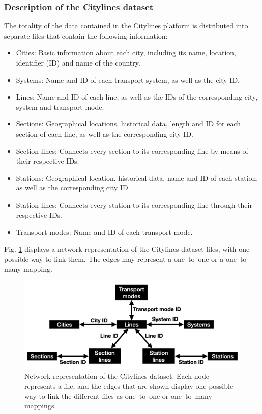 \subsubsection*{Description of the Citylines dataset}
The totality of the data contained in the Citylines platform is distributed into separate files that contain the following information:
\begin{itemize}
	\item Cities: Basic information about each city, including its name, location, identifier (ID) and name of the country.
	\item Systems: Name and ID of each transport system, as well as the city ID.
	\item Lines: Name and ID of each line, as well as the IDs of the corresponding city, system and transport mode.
	\item Sections: Geographical locations, historical data, length and ID for each section of each line, as well as the corresponding city ID.
	\item Section lines: Connects every section to its corresponding line by means of their respective IDs.
	\item Stations: Geographical location, historical data, name and ID of each station, as well as the corresponding city ID.
	\item Station lines: Connects every station to its corresponding line through their respective IDs.
	\item Transport modes: Name and ID of each transport mode.
\end{itemize}

Fig. \ref{fig:SM_cityline_dataset} displays a network representation of the Citylines dataset files, with one possible way to link them. The edges may represent a one--to--one or a one--to--many mapping.


\begin{figure}[!h]
	\begin{center}
	\includegraphics[scale=0.4]{./images/task_41/citylines_dataset.png} 
	\end{center}
	\caption{Network representation of the Citylines dataset. Each node represents a file, and the edges that are shown display one possible way to link the different files as one--to--one or one--to--many mappings. \\} 
	\label{fig:SM_cityline_dataset} 
\end{figure}



